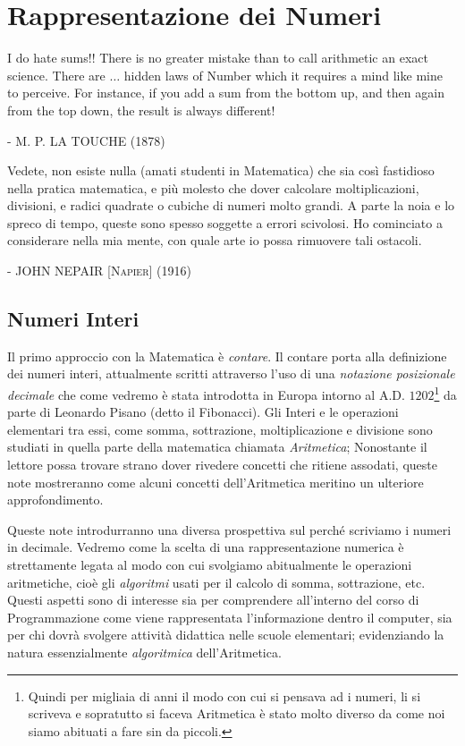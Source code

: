 
\chapter{Rappresentazione dei Numeri}

\epigraph{I do hate sums!! There is no greater mistake than to call arithmetic
an exact science. There are $\ldots$ hidden laws of Number which it requires a
mind like mine to perceive. For instance, if you add a sum from the bottom up,
and then again from the top down, the result is always different!}{ -
\textsc{M. P. LA TOUCHE} (1878)} 

\epigraph{Vedete, non esiste nulla (amati studenti in Matematica) che sia così
fastidioso nella pratica matematica, e più molesto che dover calcolare
moltiplicazioni, divisioni, e radici quadrate o cubiche di numeri molto grandi.
A parte la noia e lo spreco di tempo, queste sono spesso soggette a errori
scivolosi. Ho cominciato a considerare nella mia mente, con quale arte io possa
rimuovere tali ostacoli.} { - \textsc{JOHN NEPAIR [Napier] (1916)}}

\section[Numeri Interi]{Numeri Interi}

Il primo approccio con la Matematica è \emph{contare}. Il contare porta alla
definizione dei numeri interi, attualmente scritti attraverso l'uso di una
\emph{notazione posizionale decimale} che come vedremo è stata introdotta in
Europa intorno al A.D. $1202$\footnote{Quindi per migliaia di anni il modo con
cui si pensava ad i numeri, li si scriveva e sopratutto si faceva Aritmetica è
stato molto diverso da come noi siamo abituati a fare sin da piccoli.} da parte
di Leonardo Pisano (detto il Fibonacci). Gli Interi e le operazioni elementari
tra essi, come somma, sottrazione, moltiplicazione e divisione sono studiati in
quella parte della matematica chiamata \emph{Aritmetica}; Nonostante il lettore
possa trovare strano dover rivedere concetti che ritiene assodati, queste note
mostreranno come alcuni concetti dell'Aritmetica meritino un ulteriore approfondimento.

Queste note introdurranno una diversa prospettiva sul perché scriviamo i numeri in decimale. Vedremo come la scelta di una rappresentazione numerica è strettamente legata al modo con cui svolgiamo abitualmente le operazioni aritmetiche, cioè
gli \emph{algoritmi} usati per il calcolo di somma, sottrazione, etc. 
Questi aspetti sono di interesse sia per comprendere all'interno del corso di Programmazione come viene rappresentata l'informazione dentro il computer, sia per chi dovrà svolgere attività didattica nelle scuole
elementari; evidenziando la natura essenzialmente \emph{algoritmica}
dell'Aritmetica.

